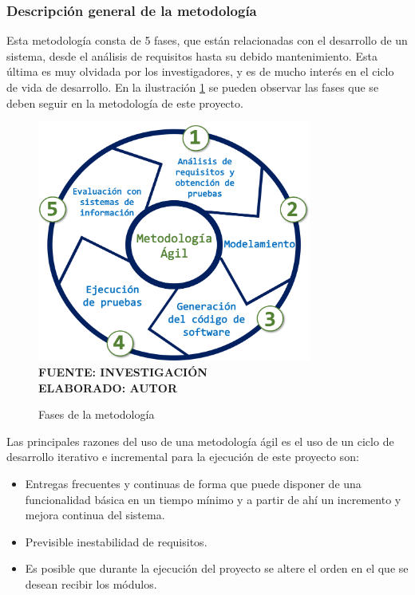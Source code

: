 \subsubsection{Descripción general de la metodología}

Esta metodología consta de 5 fases, que están relacionadas con el desarrollo de un sistema, desde el análisis de requisitos hasta su debido mantenimiento. Esta última es muy olvidada por los investigadores, y es de mucho interés en el ciclo de vida de desarrollo. En la ilustración \ref{fig:metod} se pueden observar las fases que se deben seguir en la metodología de este proyecto.

\begin{figure}[h!]
	\centering
	\caption{Fases de la metodología}
	\includegraphics[width=9cm]{img/metodologia.png}
	\label{fig:metod}
	\vspace{4mm}
	{\footnotesize \textbf{\\ FUENTE: INVESTIGACIÓN} \textbf{\\ ELABORADO: AUTOR}}
\end{figure}

Las principales razones del uso de una metodología ágil es el uso de un ciclo de desarrollo iterativo e incremental para la ejecución de este proyecto son:

\begin{itemize}
	\item Entregas frecuentes y continuas de forma que puede disponer de una funcionalidad básica en un tiempo mínimo y a partir de ahí un incremento y mejora continua del sistema.
	
	\item Previsible inestabilidad de requisitos. 
	
	\item Es posible que durante la ejecución del proyecto se altere el orden en el que se desean recibir los módulos.
\end{itemize} 

